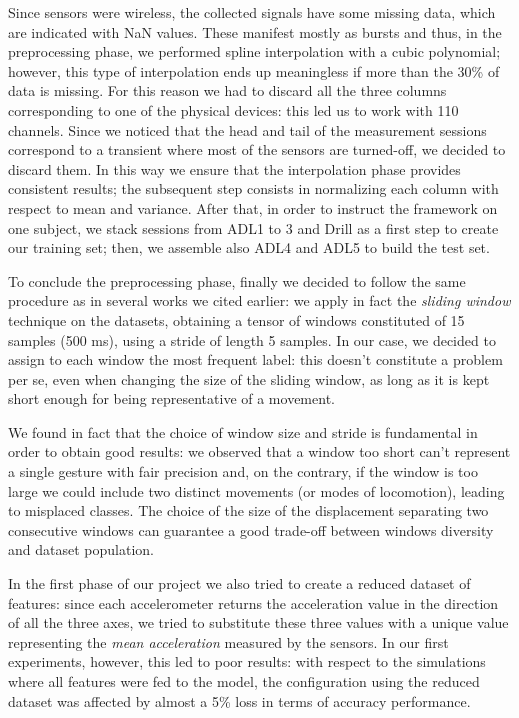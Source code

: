 Since sensors were wireless, the collected signals have some missing data, which are indicated with NaN values. These manifest mostly as bursts and thus, in the preprocessing phase, we performed spline interpolation with a cubic polynomial; however, this type of interpolation ends up meaningless if more than the 30\% of data is missing. For this reason we had to discard all the three columns corresponding to one of the physical devices: this led us to work with 110 channels. Since we noticed that the head and tail of the measurement sessions correspond to a transient where most of the sensors are turned-off, we decided to discard them. In this way we ensure that the interpolation phase provides consistent results; the subsequent step consists in normalizing each column with respect to mean and variance. After that, in order to instruct the framework on one subject, we stack sessions from ADL1 to 3 and Drill as a first step to create our training set; then, we assemble also ADL4 and ADL5 to build the test set. 

To conclude the preprocessing phase, finally we decided to follow the same procedure as in several works we cited earlier: we apply in fact the \textit{sliding window} technique on the datasets, obtaining a tensor of windows constituted of 15 samples (500 ms), using a stride of length 5 samples. In our case, we decided to assign to each window the most frequent label: this doesn't constitute a problem per se, even when changing the size of the sliding window, as long as it is kept short enough for being representative of a movement.

We found in fact that the choice of window size and stride is fundamental in order to obtain good results: we observed that a window too short can't represent a single gesture with fair precision and, on the contrary, if the window is too large we could include two distinct movements (or modes of locomotion), leading to misplaced classes. The choice of the size of the displacement separating two consecutive windows can guarantee a good trade-off between windows diversity and dataset population.

In the first phase of our project we also tried to create a reduced dataset of features: since each accelerometer returns the acceleration value in the direction of all the three axes, we tried to substitute these three values with a unique value representing the \textit{mean acceleration} measured by the sensors. In our first experiments, however, this led to poor results: with respect to the simulations where all features were fed to the model, the configuration using the reduced dataset was affected by almost a 5\% loss in terms of accuracy performance. 

